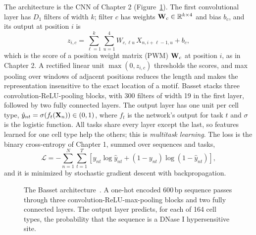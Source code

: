 The architecture is the CNN of Chapter 2 (Figure~\ref{fig:basset_arch}). The first convolutional layer has $D_1$ filters of width $k$; filter $c$ has weights $\mathbf{W}_c\in\mathbb{R}^{k\times 4}$ and bias $b_c$, and its output at position $i$ is
\begin{equation}
  z_{i,c} = \sum_{\ell=1}^{k}\sum_{u=1}^{4} W_{c,\ell u}\,X_{n,i+\ell-1,u} + b_c ,
\end{equation}
which is the score of a position weight matrix (PWM) $\mathbf{W}_c$ at position $i$, as in Chapter 2. A rectified linear unit $\max(0,z_{i,c})$ thresholds the scores, and max pooling over windows of adjacent positions reduces the length and makes the representation insensitive to the exact location of a motif. Basset stacks three convolution-ReLU-pooling blocks, with 300 filters of width 19 in the first layer, followed by two fully connected layers. The output layer has one unit per cell type, $\hat y_{nt}=\sigma(f_t(\mathbf{X}_n))\in(0,1)$, where $f_t$ is the network's output for task $t$ and $\sigma$ is the logistic function. All tasks share every layer except the last, so features learned for one cell type help the others; this is \emph{multitask learning}. The loss is the binary cross-entropy of Chapter 1, summed over sequences and tasks,
\begin{equation}
  \mathcal{L} = -\sum_{n=1}^N\sum_{t=1}^T\left[y_{nt}\log\hat y_{nt} + (1-y_{nt})\log(1-\hat y_{nt})\right],
\end{equation}
and it is minimized by stochastic gradient descent with backpropagation.

\begin{figure}[t]
  \centering
  \caption{The Basset architecture~\citep{kelley2016}. A one-hot encoded 600\,bp sequence passes through three convolution-ReLU-max-pooling blocks and two fully connected layers. The output layer predicts, for each of 164 cell types, the probability that the sequence is a DNase I hypersensitive site.}
  \label{fig:basset_arch}
\end{figure}

